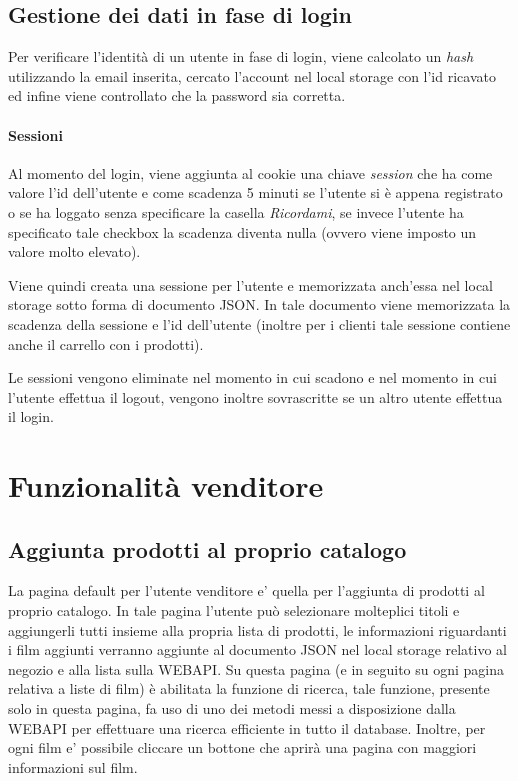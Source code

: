 \documentclass{article}
\begin{document}
    \subsection{Gestione dei dati in fase di login}
    Per verificare l'identità di un utente in fase di login, viene calcolato un \emph{hash} utilizzando la email inserita, cercato l'account nel local storage con l'id ricavato
    ed infine viene controllato che la password sia corretta.
    \paragraph{Sessioni}
    Al momento del login, viene aggiunta al cookie una chiave \emph{session} che ha come valore l'id dell'utente e come scadenza 5 minuti se l'utente si è appena registrato o se 
    ha loggato senza specificare la casella \emph{Ricordami}, se invece l'utente ha specificato tale checkbox la scadenza diventa nulla (ovvero viene imposto un valore molto elevato).

    Viene quindi creata una sessione per l'utente e memorizzata anch'essa nel local storage sotto forma di documento JSON.
    In tale documento viene memorizzata la scadenza della sessione e l'id dell'utente (inoltre per i clienti tale sessione contiene anche il carrello con i prodotti).

    Le sessioni vengono eliminate nel momento in cui scadono e nel momento in cui l'utente effettua il logout, vengono inoltre sovrascritte se un altro utente effettua il login.

\section{Funzionalità venditore}
    \subsection{Aggiunta prodotti al proprio catalogo}
    La pagina default per l'utente venditore e' quella per l'aggiunta di prodotti al proprio catalogo.
    In tale pagina l'utente può selezionare molteplici titoli e aggiungerli tutti insieme alla propria lista di prodotti,
    le informazioni riguardanti i film aggiunti verranno aggiunte al documento JSON nel local storage relativo al negozio e alla lista sulla WEBAPI.
    Su questa pagina (e in seguito su ogni pagina relativa a liste di film) è abilitata la funzione di ricerca, tale funzione, presente solo in questa pagina, fa uso di uno dei metodi
    messi a disposizione dalla WEBAPI per effettuare una ricerca efficiente in tutto il database.
    Inoltre,
    per ogni film e' possibile cliccare un bottone che aprirà una pagina con maggiori informazioni sul film.
\end{document}
